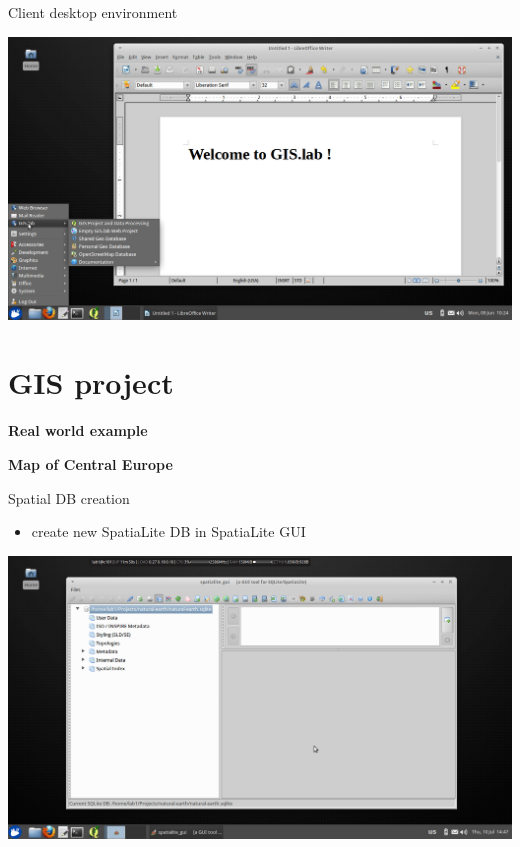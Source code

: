 \documentclass[12pt]{beamer}
\begin{document}
\begin{frame}{Client desktop environment}
	\begin{center}
		\includegraphics[keepaspectratio=true,height=0.7\textheight]{images/real-world-example/client-desktop-libreoffice.png}
	\end{center}
\end{frame}


\section{GIS project}
\begin{frame}
	\begin{center}
		\LARGE\textbf{Real world example}\normalsize

		\textbf{Map of Central Europe}
	\end{center}
\end{frame}


\begin{frame}{Spatial DB creation}
	\begin{itemize}
		\item create new SpatiaLite DB in SpatiaLite GUI
	\end{itemize}
	\begin{center}
		\includegraphics[keepaspectratio=true,height=0.7\textheight]{images/rapid-gis-deployment/project-create-db.png}
	\end{center}
\end{frame}
\end{document}
